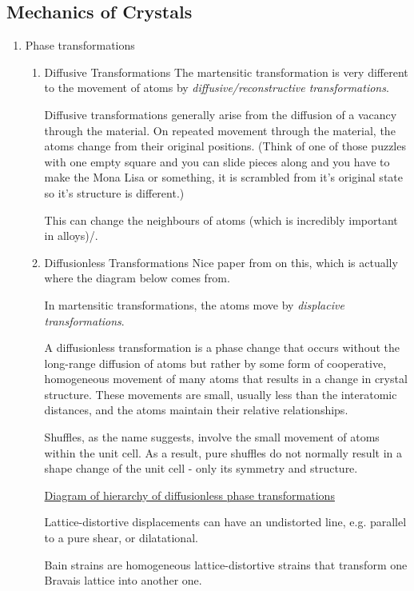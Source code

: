 \documentclass[11pt]{article}
\begin{document}
\subsection{Mechanics of Crystals}
\label{sec:org7d0e346}
\begin{enumerate}
\item Phase transformations
\label{sec:org9090646}
\begin{enumerate}
\item Diffusive Transformations
\label{sec:orge73203e}
The martensitic transformation is very different to the movement of atoms by
\emph{diffusive/reconstructive transformations}. 

Diffusive transformations generally arise from the diffusion of a vacancy
through the material. On repeated movement through the material, the atoms
change from their original positions. (Think of one of those puzzles with one
empty square and you can slide pieces along and you have to make the Mona Lisa or
something, it is scrambled from it's original state so it's structure is different.)

This can change the neighbours of atoms (which is incredibly important in
alloys)/. 

\item Diffusionless Transformations
\label{sec:orgf1509af}
Nice paper from \cite{Christian1995} on this, which is actually where the
diagram below comes from. 

In martensitic transformations, the atoms move by
 \emph{displacive transformations}.

A diffusionless transformation is a phase change that occurs without the
long-range diffusion of atoms but rather by some form of cooperative, 
homogeneous movement of many atoms that results in a change in crystal 
structure. These movements are small, usually less than the interatomic
 distances, and the atoms maintain their relative relationships. 

Shuffles, as the name suggests, involve the small movement of atoms within the
unit cell. As a result, pure shuffles do not normally result in a shape change
of the unit cell - only its symmetry and structure. 

\href{Images/Diffusionless\_classification.svg}{Diagram of hierarchy of diffusionless phase transformations}

Lattice-distortive displacements can have an undistorted line, e.g. parallel
to a pure shear, or dilatational. 

Bain strains are homogeneous lattice-distortive strains that transform one
Bravais lattice into another one. 


\end{enumerate}
\end{enumerate}
\end{document}
